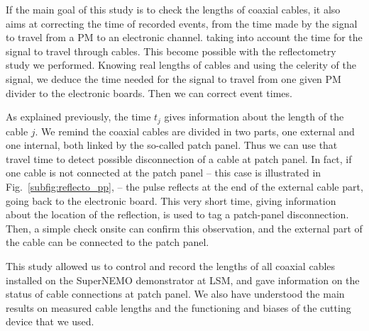If the main goal of this study is to check the lengths of coaxial cables, it also aims at correcting the time of recorded events, from the time made by the signal to travel from a PM to an electronic channel.
taking into account the time for the signal to travel through cables.
This become possible with the reflectometry study we performed.
Knowing real lengths of cables and using the celerity of the signal, we deduce the time needed for the signal to travel from one given PM divider to the electronic boards.
Then we can correct event times.

As explained previously, the time $t_{j}$ gives information about the length of the cable $j$.
We remind the coaxial cables are divided in two parts, one external and one internal, both linked by the so-called patch panel.
Thus we can use that travel time to detect possible disconnection of a cable at patch panel.
In fact, if one cable is not connected at the patch panel -- this case is illustrated in Fig.~\ref{subfig:reflecto_pp}, -- the pulse reflects at the end of the external cable part, going back to the electronic board.
This very short time, giving information about the location of the reflection, is used to tag a patch-panel disconnection.
Then, a simple check onsite can confirm this observation, and the external part of the cable can be connected to the patch panel.

This study allowed us to control and record the lengths of all coaxial cables installed on the SuperNEMO demonstrator at LSM, and gave information on the status of cable connections at patch panel.
We also have understood the main results on measured cable lengths and the functioning and biases of the cutting device that we used.

